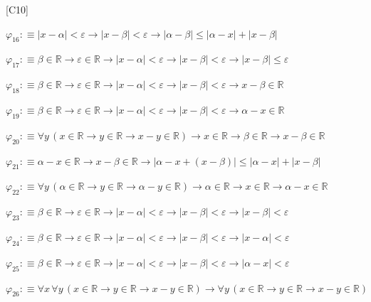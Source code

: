 \begin{fullproof}{[C10]}
\begin{abbrevlist}
\item $\varphi_{16} :\equiv \lvert x - \alpha \rvert < \varepsilon \to \lvert x - \beta \rvert < \varepsilon \to \lvert \alpha - \beta \rvert \leq \lvert \alpha - x \rvert + \lvert x - \beta \rvert$
\item $\varphi_{17} :\equiv \beta \in \mathbb{R} \to \varepsilon \in \mathbb{R} \to \lvert x - \alpha \rvert < \varepsilon \to \lvert x - \beta \rvert < \varepsilon \to \lvert x - \beta \rvert \leq \varepsilon$
\item $\varphi_{18} :\equiv \beta \in \mathbb{R} \to \varepsilon \in \mathbb{R} \to \lvert x - \alpha \rvert < \varepsilon \to \lvert x - \beta \rvert < \varepsilon \to x - \beta \in \mathbb{R}$
\item $\varphi_{19} :\equiv \beta \in \mathbb{R} \to \varepsilon \in \mathbb{R} \to \lvert x - \alpha \rvert < \varepsilon \to \lvert x - \beta \rvert < \varepsilon \to \alpha - x \in \mathbb{R}$
\item $\varphi_{20} :\equiv \forall y\,(x \in \mathbb{R} \to y \in \mathbb{R} \to x - y \in \mathbb{R}) \to x \in \mathbb{R} \to \beta \in \mathbb{R} \to x - \beta \in \mathbb{R}$
\item $\varphi_{21} :\equiv \alpha - x \in \mathbb{R} \to x - \beta \in \mathbb{R} \to \lvert \alpha - x + (x - \beta) \rvert \leq \lvert \alpha - x \rvert + \lvert x - \beta \rvert$
\item $\varphi_{22} :\equiv \forall y\,(\alpha \in \mathbb{R} \to y \in \mathbb{R} \to \alpha - y \in \mathbb{R}) \to \alpha \in \mathbb{R} \to x \in \mathbb{R} \to \alpha - x \in \mathbb{R}$
\item $\varphi_{23} :\equiv \beta \in \mathbb{R} \to \varepsilon \in \mathbb{R} \to \lvert x - \alpha \rvert < \varepsilon \to \lvert x - \beta \rvert < \varepsilon \to \lvert x - \beta \rvert < \varepsilon$
\item $\varphi_{24} :\equiv \beta \in \mathbb{R} \to \varepsilon \in \mathbb{R} \to \lvert x - \alpha \rvert < \varepsilon \to \lvert x - \beta \rvert < \varepsilon \to \lvert x - \alpha \rvert < \varepsilon$
\item $\varphi_{25} :\equiv \beta \in \mathbb{R} \to \varepsilon \in \mathbb{R} \to \lvert x - \alpha \rvert < \varepsilon \to \lvert x - \beta \rvert < \varepsilon \to \lvert \alpha - x \rvert < \varepsilon$
\item $\varphi_{26} :\equiv \forall x\,\forall y\,(x \in \mathbb{R} \to y \in \mathbb{R} \to x - y \in \mathbb{R}) \to \forall y\,(x \in \mathbb{R} \to y \in \mathbb{R} \to x - y \in \mathbb{R})$

\end{abbrevlist}
\end{fullproof}
